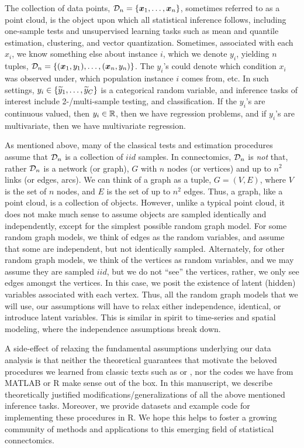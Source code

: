 \documentclass[final,leqno]{article}
\begin{document}
 The collection of data points, $\mathcal{D}_n=\{\boldsymbol{x}_1,\ldots,\boldsymbol{x}_n\}$, sometimes referred to as a point cloud, is the object upon which all statistical inference follows,  including one-sample tests and unsupervised learning tasks such as mean and quantile estimation, clustering, and vector quantization.  Sometimes, associated with each $x_i$, we know something else about instance $i$, which we denote $y_i$, yielding $n$ tuples, $\mathcal{D}_n = \{(\boldsymbol{x}_1,y_1),\ldots, (\boldsymbol{x}_n,y_n)\}$.  The $y_i$'s could denote which condition $x_i$ was observed under, which population instance $i$ comes from, etc.  In such settings, $y_i \in \{\widetilde{y}_1,\ldots,\widetilde{y}_C\}$ is a categorical random variable, and inference tasks of interest include 2-/multi-sample testing, and classification.  If the $y_i$'s are continuous valued, then $y_i \in \mathbb{R}$, then we have regression problems, and if $y_i$'s are multivariate, then we have multivariate regression.  

As mentioned above, many of the classical tests and estimation procedures assume that  $\mathcal{D}_n$ is a collection of $iid$ samples.  In connectomics, $\mathcal{D}_n$ is \emph{not} that, rather $\mathcal{D}_n$ is a network (or graph), $G$ with $n$ nodes (or vertices) and up to $n^2$ links (or edges, arcs).  We can think of a graph as a tuple, $G=(V,E)$, where $V$ is the set of $n$ nodes, and $E$ is the set of up to $n^2$ edges.  Thus, a graph, like a point cloud, is a collection of objects.  However, unlike a typical point cloud, it does not make much sense to assume objects are sampled identically and independently, except for the simplest possible random graph model.  For some random graph models, we think of edges as the random variables, and assume that some are independent, but not identically sampled.  Alternately, for other random graph models, we think of the vertices as random variables, and we may assume they are sampled $iid$, but we do not ``see'' the vertices, rather, we only see edges amongst the vertices.  In this case, we posit the existence of latent (hidden) variables associated with each vertex.  Thus, all the random graph models that we will use, our assumptions will have to relax either independence, identical, or introduce latent variables.  This is similar in spirit to time-series and spatial modeling, where the independence assumptions break down.

A side-effect of relaxing the fundamental assumptions underlying our data analysis is that neither the theoretical guarantees that motivate  the beloved procedures we learned from classic texts such as \cite{hastie2004elements} or \cite{Rice1995}, nor the codes we have from MATLAB or R make sense out of the box.  In this manuscript, we describe theoretically justified modifications/generalizations of all the above mentioned inference tasks.  Moreover, we provide datasets and example code for implementing these procedures in R.  We hope this helps to foster a growing community of methods and applications to this emerging field of statistical connectomics.
\end{document}
